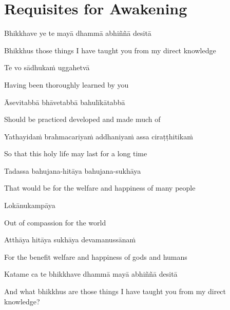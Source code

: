 \clearpage

\section*{Requisites for Awakening}

\begin{leader}
\end{leader}

Bhikkhave ye te mayā dhammā abhiññā desitā

\begin{cprenglish}
Bhikkhus those things I have taught you from my direct knowledge
\end{cprenglish}

Te vo sādhukaṁ uggahetvā

\begin{cprenglish}
Having been thoroughly learned by you
\end{cprenglish}

Āsevitabbā bhāvetabbā bahulīkātabbā

\begin{cprenglish}
Should be practiced developed and made much of
\end{cprenglish}

Yathayidaṁ brahmacariyaṁ addhaniyaṁ assa ciraṭṭhitikaṁ

\begin{cprenglish}
So that this holy life may last for a long time
\end{cprenglish}

Tadassa bahujana-hitāya bahujana-sukhāya

\begin{cprenglish}
That would be for the welfare and happiness of many people
\end{cprenglish}

Lokānukampāya

\begin{cprenglish}
Out of compassion for the world
\end{cprenglish}

Atthāya hitāya sukhāya devamanussānaṁ

\begin{cprenglish}
For the benefit welfare and happiness of gods and humans
\end{cprenglish}

Katame ca te bhikkhave dhammā mayā abhiññā desitā

\begin{cprenglish}
And what bhikkhus are those things I have taught you from my direct knowledge?
\end{cprenglish}

